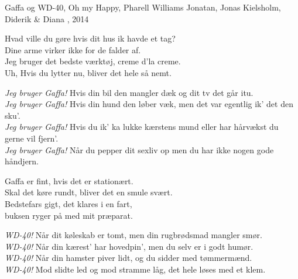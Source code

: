 \begin{song}{Gaffa og WD-40, Oh my}
  {} %
  {Happy, Pharell Williams} %
  {Jonatan, Jonas Kielsholm, Diderik \& Diana} %
  {\TKET{}, 2014} %
  {\NotCCLIed} %

  \begin{SBVerse}
    Hvad ville du gøre hvis dit hus ik havde et tag?\\
    Dine arme virker ikke for de falder af.\\
    Jeg bruger det bedste værktøj, creme d’la creme.\\
    Uh, Hvis du lytter nu, bliver det hele så nemt.
  \end{SBVerse}

  \begin{SBChorus}
    \emph{Jeg bruger Gaffa!}
    Hvis din bil den mangler dæk og dit tv det går itu.\\
    \emph{Jeg bruger Gaffa!}
    Hvis din hund den løber væk, men det var egentlig ik’ det den sku’.\\
    \emph{Jeg bruger Gaffa!}
    Hvis du ik’ ka lukke kærstens mund eller har hårvækst du gerne vil fjern’.\\
    \emph{Jeg bruger Gaffa!}
    Når du pepper dit sexliv op men du har ikke nogen gode håndjern.
  \end{SBChorus}

  \begin{SBVerse}
    Gaffa er fint, hvis det er stationært.\\
    Skal det køre rundt, bliver det en smule svært.\\
    Bedstefars gigt, det klares i en fart,\\
    buksen ryger på med mit præparat.
  \end{SBVerse}

  \begin{SBChorus}
    \emph{WD-40!} Når dit køleskab er tomt, men din rugbrødsmad mangler smør.\\
    \emph{WD-40!} Når din kærest’ har hovedpin’, men du selv er i godt humør.\\
    \emph{WD-40!} Når din hamster piver lidt, og du sidder med tømmermænd.\\
    \emph{WD-40!} Mod slidte led og mod stramme låg, det hele løses med et klem.
  \end{SBChorus}


\end{song}
